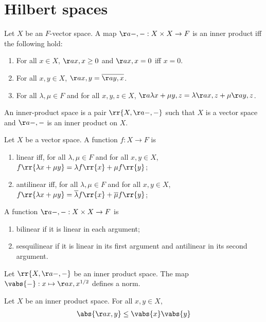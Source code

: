 \documentclass{article}
\begin{document}
\section{Hilbert spaces}
\label{sec:hilbert-spaces}

\begin{definition}
  \label{def:inner-product}
  Let $X$ be an $F$-vector space. A map $\aa{-,-}:X\times X\to F$ is an inner product iff
  the following hold:
  \begin{enumerate}
    \item For all $x\in X$, $\aa{x,x}\geq 0$ and $\aa{x,x}=0$ iff $x=0$.
    \item For all $x,y\in X$, $\aa{x,y}=\overline{\aa{y,x}}$.
    \item For all $\lambda,\mu\in F$ and for all $x,y,z\in X$, $\aa{\lambda x+\mu y,z}=\lambda\aa{x,z}+\mu\aa{y,z}$.
  \end{enumerate}
  An inner-product space is a pair $\rr{X,\aa{-,-}}$ such that $X$ is a vector space and
  $\aa{-,-}$ is an inner product on $X$.
\end{definition}

\begin{definition}
  \label{def:linear}
  Let $X$ be a vector space. A function $f:X\to F$ is
  \begin{enumerate}
    \item linear iff, for all $\lambda,\mu\in F$ and for all $x,y\in X$, $f\rr{\lambda x+\mu y}=\lambda f\rr{x}+\mu f\rr{y}$;
    \item antilinear iff, for all $\lambda,\mu\in F$ and for all $x,y\in X$, $f\rr{\lambda x+\mu y}=\overline\lambda f\rr{x}+\overline\mu f\rr{y}$;
  \end{enumerate}
  A function $\aa{-,-}:X\times X\to F$ is
  \begin{enumerate}
    \item bilinear if it is linear in each argument;
    \item sesquilinear if it is linear in its first argument and antilinear in its second argument.
  \end{enumerate}
\end{definition}


\begin{theorem}
  Let $\rr{X,\aa{-,-}}$ be an inner product space. The map $\vabs{-}:x\mapsto \aa{x,x}^{1/2}$ defines a norm.
\end{theorem}

\begin{theorem}
  Let $X$ be an inner product space. For all $x,y\in X$,
  \begin{align*}
    \abs{\aa{x,y}}\leq \vabs{x}\vabs{y}
  \end{align*}
\end{theorem}
\end{document}
